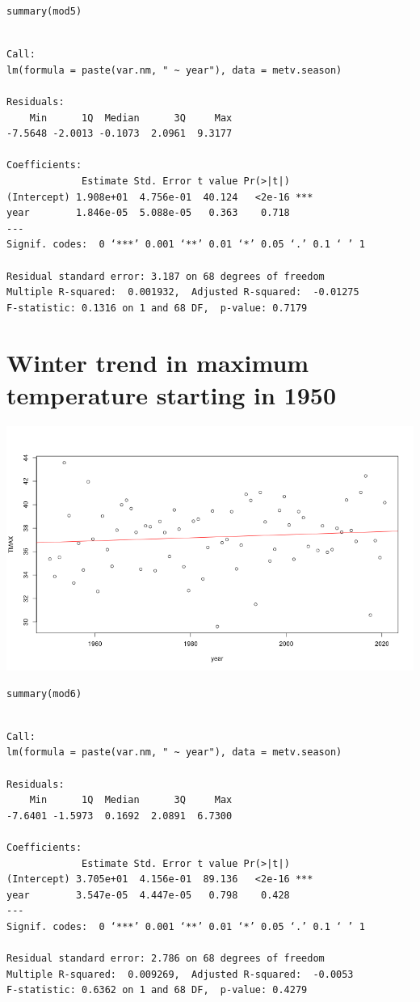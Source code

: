 \documentclass[11pt]{article}
\begin{document}
\begin{verbatim}
summary(mod5)
\end{verbatim}

\begin{verbatim}

Call:
lm(formula = paste(var.nm, " ~ year"), data = metv.season)

Residuals:
    Min      1Q  Median      3Q     Max 
-7.5648 -2.0013 -0.1073  2.0961  9.3177 

Coefficients:
             Estimate Std. Error t value Pr(>|t|)    
(Intercept) 1.908e+01  4.756e-01  40.124   <2e-16 ***
year        1.846e-05  5.088e-05   0.363    0.718    
---
Signif. codes:  0 ‘***’ 0.001 ‘**’ 0.01 ‘*’ 0.05 ‘.’ 0.1 ‘ ’ 1

Residual standard error: 3.187 on 68 degrees of freedom
Multiple R-squared:  0.001932,	Adjusted R-squared:  -0.01275 
F-statistic: 0.1316 on 1 and 68 DF,  p-value: 0.7179
\end{verbatim}

\section{Winter trend in maximum temperature starting in 1950}
\label{sec:org09c73f0}

\begin{center}
\includegraphics[width=.9\linewidth]{summer_tmin_1950.png}
\end{center}


\begin{verbatim}
summary(mod6)
\end{verbatim}

\begin{verbatim}

Call:
lm(formula = paste(var.nm, " ~ year"), data = metv.season)

Residuals:
    Min      1Q  Median      3Q     Max 
-7.6401 -1.5973  0.1692  2.0891  6.7300 

Coefficients:
             Estimate Std. Error t value Pr(>|t|)    
(Intercept) 3.705e+01  4.156e-01  89.136   <2e-16 ***
year        3.547e-05  4.447e-05   0.798    0.428    
---
Signif. codes:  0 ‘***’ 0.001 ‘**’ 0.01 ‘*’ 0.05 ‘.’ 0.1 ‘ ’ 1

Residual standard error: 2.786 on 68 degrees of freedom
Multiple R-squared:  0.009269,	Adjusted R-squared:  -0.0053 
F-statistic: 0.6362 on 1 and 68 DF,  p-value: 0.4279
\end{verbatim}
\end{document}
